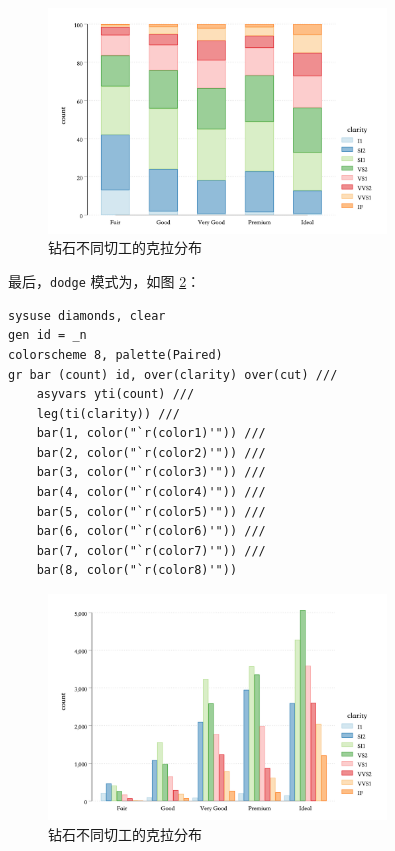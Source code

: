 \documentclass[]{ctexbook}
\begin{document}
\begin{figure}

{\centering \includegraphics[width=0.8\textwidth]{assets/percentcutclarity} 

}

\caption{钻石不同切工的克拉分布}\label{fig:percentcutclarity}
\end{figure}

最后，\texttt{dodge} 模式为，如图 \ref{fig:dodgecutclarity}：

\begin{lstlisting}
sysuse diamonds, clear
gen id = _n
colorscheme 8, palette(Paired)
gr bar (count) id, over(clarity) over(cut) ///
    asyvars yti(count) ///
    leg(ti(clarity)) ///
    bar(1, color("`r(color1)'")) ///
    bar(2, color("`r(color2)'")) ///
    bar(3, color("`r(color3)'")) ///
    bar(4, color("`r(color4)'")) ///
    bar(5, color("`r(color5)'")) ///
    bar(6, color("`r(color6)'")) ///
    bar(7, color("`r(color7)'")) ///
    bar(8, color("`r(color8)'"))
\end{lstlisting}

\begin{figure}

{\centering \includegraphics[width=0.8\textwidth]{assets/dodgecutclarity} 

}

\caption{钻石不同切工的克拉分布}\label{fig:dodgecutclarity}
\end{figure}
\end{document}
